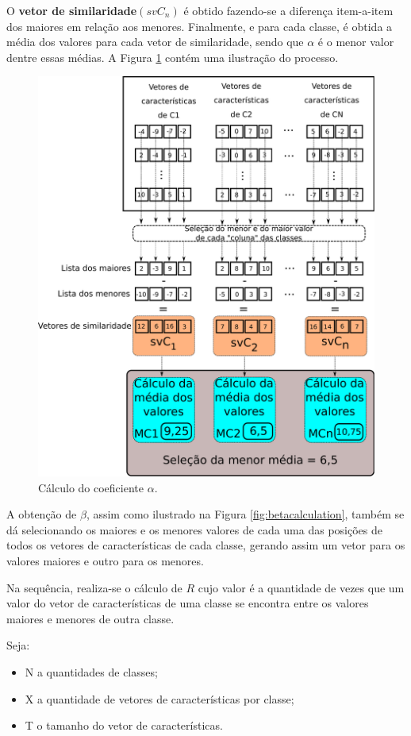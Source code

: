 				\par O \textbf{vetor de similaridade}$(svC_n)$ é obtido fazendo-se a diferença item-a-item dos maiores em relação aos menores. Finalmente, e para cada classe, é obtida a média dos valores para cada vetor de similaridade, sendo que $\alpha$ é o menor valor dentre essas médias. A Figura \ref{fig:calculoalpha} contém uma ilustração do processo.
				
				\begin{figure}
					\centering
		       	\includegraphics[width=0.7\linewidth]{images/calculoAlpha.pdf}
					\caption{Cálculo do coeficiente $\alpha$.}
					\label{fig:calculoalpha}
				\end{figure}
				
				\par A obtenção de $\beta$, assim como ilustrado na Figura \ref{fig:betacalculation}, também se dá selecionando os maiores e os menores valores de cada uma das posições de todos os vetores de características de cada classe, gerando assim um vetor para os valores maiores e outro para os menores.
				
				\par Na sequência, realiza-se o cálculo de $R$ cujo valor é a quantidade de vezes que um valor do vetor de características de uma classe se encontra entre os valores maiores e menores de outra classe.
				
				\par Seja:
				\begin{itemize}
					\item N a quantidades de classes;
					\item X a quantidade de vetores de características por classe;
					\item T o tamanho do vetor de características.
				\end{itemize}
				
